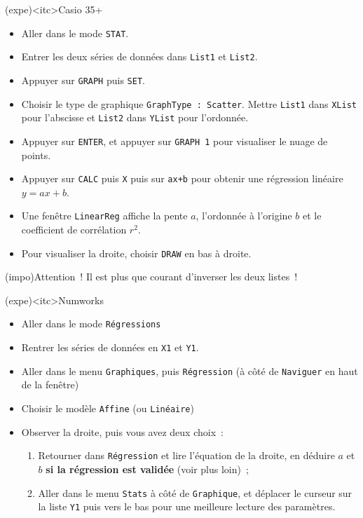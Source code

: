 \documentclass[a4paper, 12pt, garamond]{book}
\begin{document}
\begin{tcn}[breakable](expe)<itc>{Casio 35+}
	\begin{itemize}
		\item Aller dans le mode \texttt{STAT}.
		\item Entrer les deux séries de données dans \texttt{List1} et
		      \texttt{List2}.
		\item Appuyer sur \texttt{GRAPH} puis \texttt{SET}.
		\item Choisir le type de graphique \texttt{GraphType~: Scatter}. Mettre
		      \texttt{List1} dans \texttt{XList} pour l'abscisse et \texttt{List2}
		      dans \texttt{YList} pour l'ordonnée.
		\item Appuyer sur \texttt{ENTER}, et appuyer sur \texttt{GRAPH 1} pour
		      visualiser le nuage de points.
		\item Appuyer sur \texttt{CALC} puis \texttt{X} puis sur \texttt{ax+b} pour
		      obtenir une régression linéaire $y = ax+b$.
		\item Une fenêtre \texttt{LinearReg} affiche la pente $a$, l'ordonnée à
		      l'origine $b$ et le coefficient de corrélation $r^{2}$.
		\item Pour visualiser la droite, choisir \texttt{DRAW} en bas à droite.
	\end{itemize}
\end{tcn}

\begin{tcn}(impo){Attention~!}
	Il est plus que courant d'inverser les deux listes~!
\end{tcn}

\begin{tcn}[breakable](expe)<itc>{Numworks}
	\begin{itemize}
		\item Aller dans le mode \texttt{Régressions}
		\item Rentrer les séries de données en \texttt{X1} et \texttt{Y1}.
		\item Aller dans le menu \texttt{Graphiques}, puis \texttt{Régression} (à
		      côté de \texttt{Naviguer} en haut de la fenêtre)
		\item Choisir le modèle \texttt{Affine} (ou \texttt{Linéaire})
		\item Observer la droite, puis vous avez deux choix~:
		      \begin{enumerate}
			      \item Retourner dans \texttt{Régression} et lire l'équation de la
			            droite, en déduire $a$ et $b$ \textbf{si la régression est validée}
			            (voir plus loin)~;
			      \item Aller dans le menu \texttt{Stats} à côté de \texttt{Graphique}, et
			            déplacer le curseur sur la liste \texttt{Y1} puis vers le bas pour une
			            meilleure lecture des paramètres.
		      \end{enumerate}
	\end{itemize}
\end{tcn}
\end{document}
